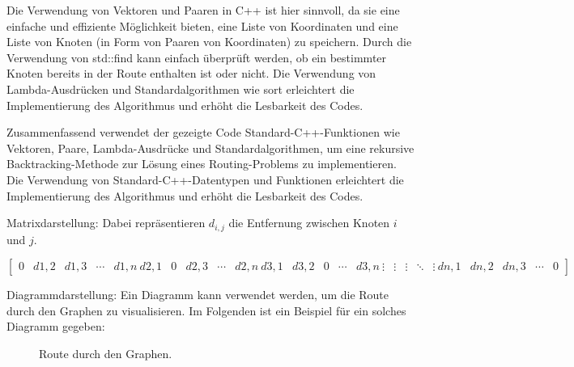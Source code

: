 \documentclass[a4paper,10pt,ngerman]{scrartcl}
\begin{document}
    Die Verwendung von Vektoren und Paaren in C++ ist hier sinnvoll, da sie eine einfache und effiziente Möglichkeit bieten,
    eine Liste von Koordinaten und eine Liste von Knoten (in Form von Paaren von Koordinaten) zu speichern.
    Durch die Verwendung von std::find kann einfach überprüft werden, ob ein bestimmter Knoten bereits in der Route enthalten ist oder nicht.
    Die Verwendung von Lambda-Ausdrücken und Standardalgorithmen wie sort erleichtert die Implementierung des Algorithmus und erhöht die Lesbarkeit des Codes.

    Zusammenfassend verwendet der gezeigte Code Standard-C++-Funktionen wie Vektoren, Paare, Lambda-Ausdrücke und Standardalgorithmen,
    um eine rekursive Backtracking-Methode zur Lösung eines Routing-Problems zu implementieren.
    Die Verwendung von Standard-C++-Datentypen und Funktionen erleichtert die Implementierung des Algorithmus und erhöht die Lesbarkeit des Codes.

    \newline\newline
    Matrixdarstellung:
    Dabei repräsentieren $d_{i,j}$ die Entfernung zwischen Knoten $i$ und $j$.

    \begin{equation}
        \begin{bmatrix}
            0 & d{1,2} & d{1,3} & \cdots & d{1,n} \ d{2,1} & 0 & d{2,3} & \cdots & d{2,n} \ d{3,1} & d{3,2} &
            0 & \cdots & d{3,n} \ \vdots & \vdots & \vdots & \ddots & \vdots \ d{n,1} & d{n,2} & d{n,3} & \cdots &
            0
        \end{bmatrix}\label{eq:equation}
    \end{equation}

    Diagrammdarstellung:
    Ein Diagramm kann verwendet werden, um die Route durch den Graphen zu visualisieren.
    Im Folgenden ist ein Beispiel für ein solches Diagramm gegeben:

    \begin{figure}[htbp]
        \centering
        \caption{Route durch den Graphen.}\label{fig:figure}
    \end{figure}
\end{document}
